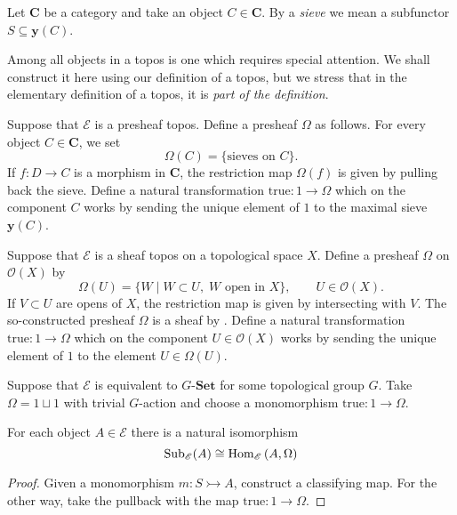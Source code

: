 \begin{definition}
\label{def:sieve}
Let $\mathbf{C}$ be a category and take an object $C \in \mathbf{C}$. By a \emph{sieve} we mean a subfunctor $S \subseteq \mathbf{y}(C)$.
\end{definition}

Among all objects in a topos is one which requires special attention. We shall construct it here using our definition of a topos, but we stress that in the elementary definition of a topos, it is \emph{part of the definition}.

\begin{construction}
Suppose that $\mathscr{E}$ is a presheaf topos. Define a presheaf $\Omega$ as follows. For every object $C \in \mathbf{C}$, we set
\[ \Omega(C) = \{\text{sieves on $C$}\}. \]
If $f : D \to C$ is a morphism in $\mathbf{C}$, the restriction map $\Omega(f)$ is given by pulling back the sieve. Define a natural transformation $\text{true}:1 \to \Omega$ which on the component $C$ works by sending the unique element of $1$ to the maximal sieve $\mathbf{y}(C)$.
\end{construction}

\begin{construction}
Suppose that $\mathscr{E}$ is a sheaf topos on a topological space $X$. Define a presheaf $\Omega$ on $\mathcal{O}(X)$ by
\[ \Omega(U) = \{W \mid W \subset U, \; W \text{ open in } X\}, \qquad U \in \mathcal{O}(X). \]
If $V \subset U$ are opens of $X$, the restriction map is given by intersecting with $V$. The so-constructed presheaf $\Omega$ is a sheaf by \cite[Theorem II.9.2]{MacLaneMoerdijk91}. Define a natural transformation $\text{true} : 1 \to \Omega$ which on the component $U \in \mathcal{O}(X)$ works by sending the unique element of $1$ to the element $U \in \Omega(U)$.
\end{construction}

\begin{construction}
Suppose that $\mathscr{E}$ is equivalent to $G\text{-}\mathbf{Set}$ for some topological group $G$. Take $\Omega = 1 \sqcup 1$ with trivial $G$-action and choose a monomorphism $\text{true} : 1 \to \Omega$.

\end{construction}

\begin{proposition}
For each object $A \in \mathscr{E}$ there is a natural isomorphism
\[ \operatorname{Sub}_\mathscr{E}(A) \cong \operatorname{Hom}_{\mathscr{E}}\left(A, \Omega \right) \]
\end{proposition}
\begin{proof}
Given a monomorphism $m : S \rightarrowtail A$, construct a classifying map. For the other way, take the pullback with the map $\text{true} : 1 \to \Omega$.
\end{proof}

